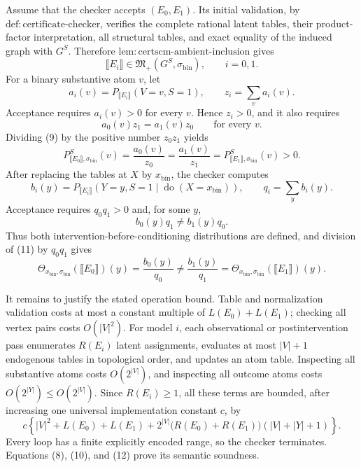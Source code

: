 Assume that the checker accepts \((E_0,E_1)\).  Its initial validation, by \(\mathrm{def:certificate\text{-}checker}\), verifies the complete rational latent tables, their product-factor interpretation, all structural tables, and exact equality of the induced graph with \(G^S\).  Therefore \(\mathrm{lem:certscm\text{-}ambient\text{-}inclusion}\) gives
\[
  \llbracket E_i\rrbracket\in\mathfrak M_+(G^S,\sigma_{\mathrm{bin}}),
  \qquad i=0,1. \tag{8}
\]
For a binary substantive atom \(v\), let
\[
 a_i(v)=P_{\llbracket E_i\rrbracket}(V=v,S=1),
 \qquad z_i=\sum_v a_i(v).
\]
Acceptance requires \(a_i(v)>0\) for every \(v\).  Hence \(z_i>0\), and it also requires
\[
 a_0(v)z_1=a_1(v)z_0\qquad\text{for every }v. \tag{9}
\]
Dividing (9) by the positive number \(z_0z_1\) yields
\[
 P^S_{\llbracket E_0\rrbracket,\sigma_{\mathrm{bin}}}(v)
 =\frac{a_0(v)}{z_0}
 =\frac{a_1(v)}{z_1}
 =P^S_{\llbracket E_1\rrbracket,\sigma_{\mathrm{bin}}}(v)>0. \tag{10}
\]
After replacing the tables at \(X\) by \(x_{\mathrm{bin}}\), the checker computes
\[
 b_i(y)=P_{\llbracket E_i\rrbracket}
   (Y=y,S=1\mid\operatorname{do}(X=x_{\mathrm{bin}})),
 \qquad q_i=\sum_y b_i(y).
\]
Acceptance requires \(q_0q_1>0\) and, for some \(y\),
\[
 b_0(y)q_1\ne b_1(y)q_0. \tag{11}
\]
Thus both intervention-before-conditioning distributions are defined, and division of (11) by \(q_0q_1\) gives
\[
 \Theta_{x_{\mathrm{bin}},\sigma_{\mathrm{bin}}}(\llbracket E_0\rrbracket)(y)
 =\frac{b_0(y)}{q_0}
 \ne\frac{b_1(y)}{q_1}
 =\Theta_{x_{\mathrm{bin}},\sigma_{\mathrm{bin}}}(\llbracket E_1\rrbracket)(y). \tag{12}
\]

It remains to justify the stated operation bound.  Table and normalization validation costs at most a constant multiple of \(L(E_0)+L(E_1)\); checking all vertex pairs costs \(O(|V|^2)\).  For model \(i\), each observational or postintervention pass enumerates \(R(E_i)\) latent assignments, evaluates at most \(|V|+1\) endogenous tables in topological order, and updates an atom table.  Inspecting all substantive atoms costs \(O(2^{|V|})\), and inspecting all outcome atoms costs \(O(2^{|Y|})\le O(2^{|V|})\).  Since \(R(E_i)\ge1\), all these terms are bounded, after increasing one universal implementation constant \(c\), by
\[
 c\left\{|V|^2+L(E_0)+L(E_1)
 +2^{|V|}\bigl(R(E_0)+R(E_1)\bigr)(|V|+|Y|+1)\right\}.
\]
Every loop has a finite explicitly encoded range, so the checker terminates.  Equations (8), (10), and (12) prove its semantic soundness.